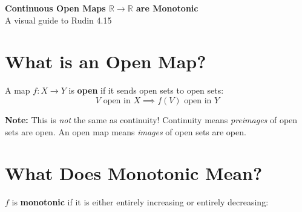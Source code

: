 \documentclass[12pt]{article}
\newcommand{\R}{\mathbb{R}}
\begin{document}
\begin{center}
    \textbf{\Large Continuous Open Maps $\R \to \R$ are Monotonic}\\[0.5em]
    \large A visual guide to Rudin 4.15
\end{center}

\section{What is an Open Map?}

A map $f: X \to Y$ is \textbf{open} if it sends open sets to open sets:
\[
V \text{ open in } X \implies f(V) \text{ open in } Y
\]

\begin{center}
\end{center}

\textbf{Note:} This is \emph{not} the same as continuity! Continuity means \emph{preimages} of open sets are open. An open map means \emph{images} of open sets are open.

\section{What Does Monotonic Mean?}

$f$ is \textbf{monotonic} if it is either entirely increasing or entirely decreasing:
\end{document}
